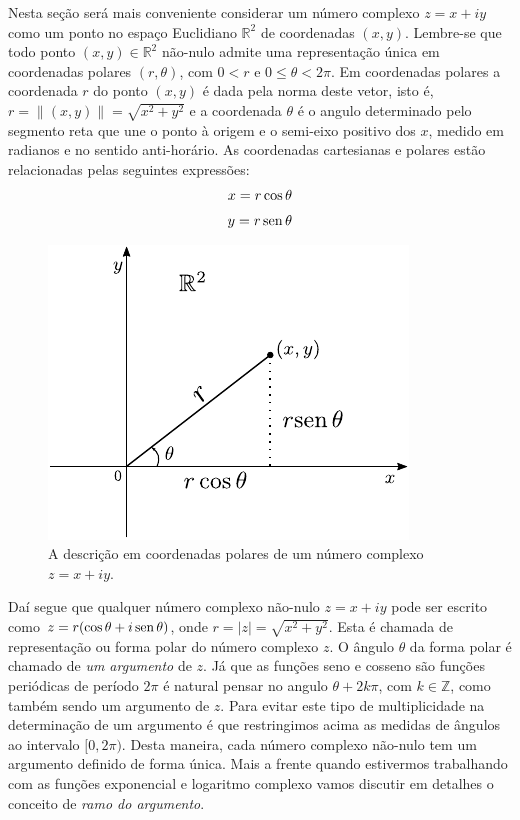 Nesta seção será mais conveniente considerar um número complexo $z=x+iy$ como um ponto no espaço Euclidiano
$\mathbb{R}^2$ de coordenadas $(x,y)$. Lembre-se que todo ponto $(x,y)\in\mathbb{R}^2$ 
não-nulo admite uma representação única em coordenadas polares $(r,\theta)$, 
com $0<r$ e $0\leqslant \theta<2\pi$.  Em coordenadas polares a coordenada $r$ do ponto $(x,y)$ é dada pela
norma deste vetor, isto é, $r=\|(x,y)\|=\sqrt{x^2+y^2}$ e a coordenada $\theta$ é o angulo determinado
pelo segmento reta que une o ponto à origem e o semi-eixo positivo dos $x$, medido em radianos e
no sentido anti-horário. As coordenadas cartesianas e polares estão relacionadas pelas seguintes
expressões:
\begin{align*}
x = r\cos \theta
\\[0.1cm]
y= r \operatorname{sen} \theta
\end{align*}
\begin{figure}[h]
\centering
\includegraphics[scale=1.2]{Figuras/fig-coordenadas-polares}
\caption{A descrição em coordenadas polares de um número complexo $z=x+iy$.}
\label{fig-coord-polares}
\end{figure}

Daí segue que qualquer número complexo não-nulo $z=x+iy$ pode ser escrito como
$z=r(\cos\theta+i\operatorname{sen}\theta)$, onde $r=|z|=\sqrt{x^2+y^2}$. 
Esta é chamada de representação ou forma polar do número complexo $z$.
O ângulo $\theta$ da forma polar é chamado de \textit{um argumento} de $z$. 
Já que as funções seno e cosseno são funções periódicas de período $2\pi$ é 
natural pensar no angulo $\theta+2k\pi$, com $k\in\mathbb{Z}$, como 
também sendo um argumento de $z$. Para evitar este tipo de multiplicidade na determinação 
de um argumento é que restringimos acima as medidas de ângulos ao intervalo $[0,2\pi)$.
Desta maneira, cada número complexo não-nulo tem um argumento definido de forma única.
Mais a frente quando estivermos trabalhando com as funções exponencial e logaritmo 
complexo vamos discutir em detalhes o conceito de \textit{ramo do argumento}. 

